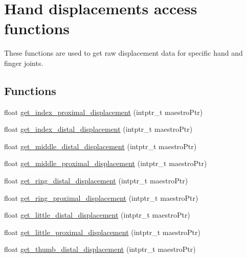 \hypertarget{group__displacement_access}{}\section{Hand displacements access functions}
\label{group__displacement_access}


These functions are used to get raw displacement data for specific hand and finger joints.  


\subsection*{Functions}
\begin{DoxyCompactItemize}
\item 
float \hyperlink{group__displacement_access_gaa1bfb69dab314ccf7e6dc1df6d3657bc}{get\+\_\+index\+\_\+proximal\+\_\+displacement} (intptr\+\_\+t maestro\+Ptr)
\item 
float \hyperlink{group__displacement_access_gac9901dae93434d4fc030170a45fae2f1}{get\+\_\+index\+\_\+distal\+\_\+displacement} (intptr\+\_\+t maestro\+Ptr)
\item 
float \hyperlink{group__displacement_access_gaca7b0c2eacb336f7214292cfc7d4098f}{get\+\_\+middle\+\_\+distal\+\_\+displacement} (intptr\+\_\+t maestro\+Ptr)
\item 
float \hyperlink{group__displacement_access_gabcd534e7e94fcbb7b35ce0406dd500bd}{get\+\_\+middle\+\_\+proximal\+\_\+displacement} (intptr\+\_\+t maestro\+Ptr)
\item 
float \hyperlink{group__displacement_access_gab0ff4384ff3e86eec80add30c96939e3}{get\+\_\+ring\+\_\+distal\+\_\+displacement} (intptr\+\_\+t maestro\+Ptr)
\item 
float \hyperlink{group__displacement_access_ga61acc449d1bb171722abef39f2c9d8bf}{get\+\_\+ring\+\_\+proximal\+\_\+displacement} (intptr\+\_\+t maestro\+Ptr)
\item 
float \hyperlink{group__displacement_access_ga4c8a12c14e6b292b513ac52fd0ab21cb}{get\+\_\+little\+\_\+distal\+\_\+displacement} (intptr\+\_\+t maestro\+Ptr)
\item 
float \hyperlink{group__displacement_access_ga010054a4a8e649390d426732de2e8792}{get\+\_\+little\+\_\+proximal\+\_\+displacement} (intptr\+\_\+t maestro\+Ptr)
\item 
float \hyperlink{group__displacement_access_gaf094ab423a9858746786b6a984ec031f}{get\+\_\+thumb\+\_\+distal\+\_\+displacement} (intptr\+\_\+t maestro\+Ptr)

\end{DoxyCompactItemize}

